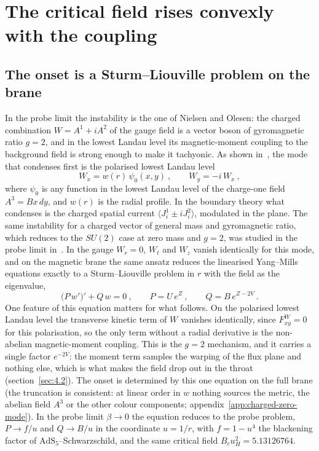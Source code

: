 \section{The critical field rises convexly with the coupling}
\label{sec:3}

\subsection{The onset is a Sturm--Liouville problem on the brane}
\label{sec:3.1}

In the probe limit the instability is the one of Nielsen and Olesen: the
charged combination $W = A^1 + iA^2$ of the gauge field is a vector boson of
gyromagnetic ratio $g = 2$, and in the lowest Landau level its
magnetic-moment coupling to the background field is strong enough to make it
tachyonic. As shown in~\cite{Ammon:2011je}, the mode that condenses first is
the polarised lowest Landau level
\begin{equation}
W_x = w(r)\,\psi_0(x,y)~, \qquad W_y = -i\,W_x~,
\end{equation}
where $\psi_0$ is any function in the lowest Landau level of the charge-one
field $A^3 = Bx\,dy$, and $w(r)$ is the radial profile. In the boundary
theory what condenses is the charged spatial current
$\langle J^1_i \pm iJ^2_i\rangle$, modulated in the plane. The same
instability for a charged vector of general mass and gyromagnetic ratio,
which reduces to the $SU(2)$ case at zero mass and $g = 2$, was studied in
the probe limit in~\cite{Cai:2013pda,Cai:2013kaa}. In the gauge $W_r = 0$,
$W_t$ and $W_z$ vanish identically for this mode, and on the magnetic brane
the same ansatz reduces the linearised Yang--Mills equations exactly to a
Sturm--Liouville problem in $r$ with the field as the eigenvalue,
\begin{equation}
\big(P\,w'\big)' + Q\,w = 0~, \qquad P = U\,e^{Z}~, \qquad Q = B\,e^{Z-2V}~.
\end{equation}
One feature of this equation matters for what follows. On the polarised lowest Landau level
the transverse kinetic term of $W$ vanishes identically, since
$F^W_{xy} = 0$ for this polarisation, so the only term without a radial
derivative is the non-abelian magnetic-moment coupling. This is the $g = 2$
mechanism, and it carries a single factor $e^{-2V}$: the moment term samples
the warping of the flux plane and nothing else, which is what makes the
field drop out in the throat (section~\ref{sec:4.2}). The onset is
determined by this one equation on the full brane (the truncation is
consistent: at linear order in $w$ nothing sources the metric, the abelian
field $A^3$ or the other colour components;
appendix~\ref{app:charged-zero-mode}). In the probe limit $\beta \to 0$ the equation
reduces to the probe problem, $P \to f/u$ and $Q \to B/u$ in the coordinate
$u = 1/r$, with $f = 1 - u^4$ the blackening factor of
$\mathrm{AdS}_5$--Schwarzschild, and the same critical field $B_c u_H^2 = 5.13126764$.

